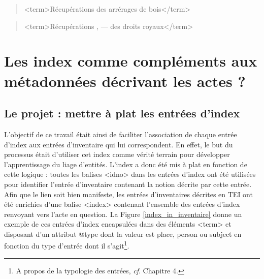 \documentclass[a4paper,12pt,twoside]{book}
\begin{document}
	\begin{quotation}
		<term>Récupérations des arrérages de bois</term>
	\end{quotation}

	\begin{quotation}
		<term>Récupérations , — des droits royaux</term>
	\end{quotation}

	\section{Les index comme compléments aux métadonnées décrivant les actes ?}

	\subsection{Le projet : mettre à plat les entrées d’index}
	
	L'objectif de ce travail était ainsi de faciliter l'association de chaque entrée d'index aux entrées d'inventaire qui lui correspondent. En effet, le but du processus était d'utiliser cet index comme vérité terrain pour développer l'apprentissage du liage d'entités. L'index a donc été mis à plat en fonction de cette logique : toutes les balises <idno> dans les entrées d'index ont été utilisées pour identifier l'entrée d'inventaire contenant la notion décrite par cette entrée. Afin que le lien soit bien manifeste, les entrées d'inventaires décrites en TEI ont été enrichies d'une balise <index> contenant l'ensemble des entrées d'index renvoyant vers l'acte en question. La Figure \ref{index_in_inventaire} donne un exemple de ces entrées d'index encapsulées dans des éléments <term> et disposant d'un attribut @type dont la valeur est \og place\fg{}, \og person\fg{} ou \og subject\fg{} en fonction du type d'entrée dont il s'agit\footnote{A propos de la typologie des entrées, \textit{cf}. Chapitre 4.}.
	
\end{document}
